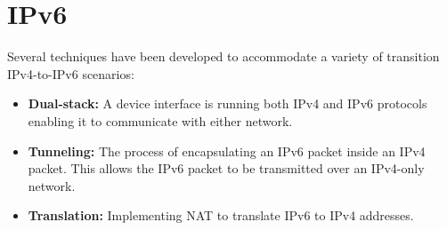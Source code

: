 \chapter{IPv6}

Several techniques have been developed to accommodate a variety of transition IPv4-to-IPv6 scenarios:

\begin{itemize}
\item \textbf{Dual-stack:} A device interface is running both IPv4 and IPv6 protocols enabling it to communicate with either network.
\item \textbf{Tunneling:} The process of encapsulating an IPv6 packet inside an IPv4 packet. This allows the IPv6 packet to be transmitted over an IPv4-only network.
\item \textbf{Translation:} Implementing NAT to translate IPv6 to IPv4 addresses.
\end{itemize}
